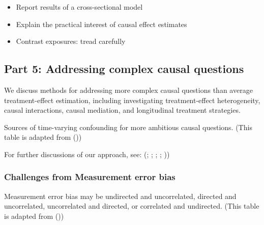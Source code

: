 \documentclass[
  singlecolumn]{article}
\providecommand{\tightlist}{%
  \setlength{\itemsep}{0pt}\setlength{\parskip}{0pt}}\usepackage{longtable,booktabs,array}
\begin{document}
\begin{itemize}
\tightlist
\item
  Report results of a cross-sectional model
\item
  Explain the practical interest of causal effect estimates
\item
  Contrast exposures: tread carefully
\end{itemize}

\newpage{}

\subsection{Part 5: Addressing complex causal
questions}\label{part-5-addressing-complex-causal-questions}

We discuss methods for addressing more complex causal questions than
average treatment-effect estimation, including investigating
treatment-effect heterogeneity, causal interactions, causal mediation,
and longitudinal treatment strategies.

\begin{table}

\caption{\label{tbl-time-varying-confounding}Sources of time-varying
confounding for more ambitious causal questions. (This table is adapted
from ())}

\centering{

\terminologytimevaryingconfounding

}

\end{table}%

For further discussions of our approach, see:
(;
;
;
;
))

\subsubsection{Challenges from Measurement error
bias}\label{challenges-from-measurement-error-bias}

\begin{table}

\caption{\label{tbl-measurement-error}Measurement error bias may be
undirected and uncorrelated, directed and uncorrelated, uncorrelated and
directed, or correlated and undirected. (This table is adapted from
())}

\centering{

\terminologymeasurementerror

}

\end{table}%
\end{document}
